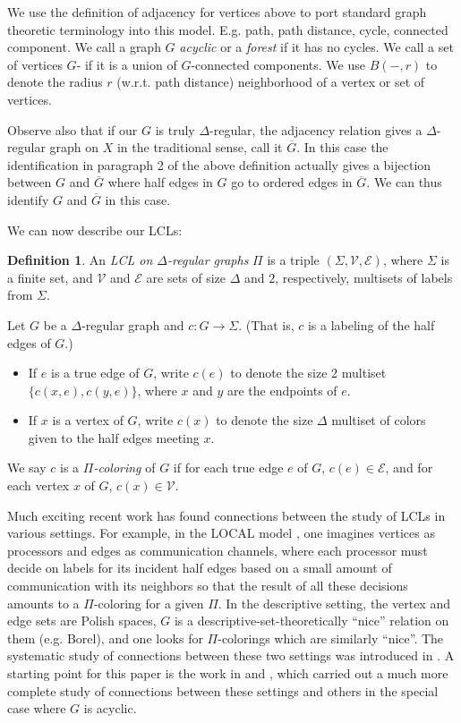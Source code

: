 \documentclass[11pt]{amsart}
\theoremstyle{definition}
\newtheorem{definition}[theorem]{Definition}
\begin{document}
We use the definition of adjacency for vertices above to port standard graph theoretic terminology into this model. E.g. path, path distance, cycle, connected component. We call a graph $G$ \textit{acyclic} or a \textit{forest} if it has no cycles. We call a set of vertices $G$- if it is a union of $G$-connected components. We use $B(-,r)$ to denote the radius $r$ (w.r.t. path distance) neighborhood of a vertex or set of vertices.

Observe also that if our $G$ is truly $\Delta$-regular, the adjacency relation gives a $\Delta$-regular graph on $X$ in the traditional sense, call it $\overline{G}$. In this case the identification in paragraph 2 of the above definition actually gives a bijection between $G$ and $\overline{G}$ where half edges in $G$ go to ordered edges in $\overline{G}$. We can thus identify $G$ and $\overline{G}$ in this case.

We can now describe our LCLs:

\begin{definition}\label{def:lcl}
	An \textit{LCL on $\Delta$-regular graphs} $\Pi$ is a triple $(\Sigma,\mathcal{V},\mathcal{E})$, where $\Sigma$ is a finite set, and $\mathcal{V}$ and $\mathcal{E}$ are sets of size $\Delta$ and $2$, respectively, multisets of labels from $\Sigma$. 
	
	Let $G$ be a $\Delta$-regular graph and $c:G \rightarrow \Sigma$. (That is, $c$ is a labeling of the half edges of $G$.)
	    \begin{itemize}
	        \item If $e$ is a true edge of $G$, write $c(e)$ to denote the size 2 multiset $\{c(x,e),c(y,e)\}$, where $x$ and $y$ are the endpoints of $e$.
	        \item If $x$ is a vertex of $G$, write $c(x)$ to denote the size $\Delta$ multiset of colors given to the half edges meeting $x$.
	    \end{itemize}
    We say $c$ is a \textit{$\Pi$-coloring} of $G$ if for each true edge $e$ of $G$, $c(e) \in \mathcal{E}$, and for each vertex $x$ of $G$, $c(x) \in \mathcal{V}$.
\end{definition}

Much exciting recent work has found connections between the study of LCLs in various settings. For example, in the LOCAL model \cite{linial_LOCAL}, one imagines vertices as processors and edges as communication channels, where each processor must decide on labels for its incident half edges based on a small amount of communication with its neighbors so that the result of all these decisions amounts to a $\Pi$-coloring for a given $\Pi$. In the descriptive setting, the vertex and edge sets are Polish spaces, $G$ is a descriptive-set-theoretically ``nice'' relation on them (e.g. Borel), and one looks for $\Pi$-colorings which are similarly ``nice''. The systematic study of connections between these two settings was introduced in \cite{Bernshteyn.distributed}. A starting point for this paper is the work in \cite{G+_trees} and \cite{BCG_Trees2}, which carried out a much more complete study of connections between these settings and others in the special case where $G$ is acyclic. 
\end{document}
